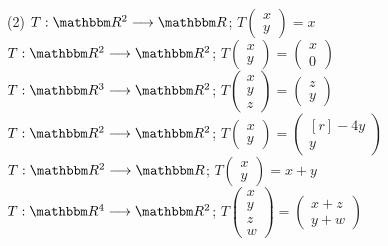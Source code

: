 \begin{tasks}[
    start=47,
    style=enumerate,
    label-offset = 3mm,
    ](2)
    \task $T: \RR[2] \longrightarrow \RR$; $T\begin{pmatrix}x \\ y\end{pmatrix}=x$
    \task $T: \RR[2] \longrightarrow \RR[2]$; $T\begin{pmatrix}x \\ y\end{pmatrix}=\begin{pmatrix}x \\ 0\end{pmatrix}$
    \task $T: \RR[3] \longrightarrow \RR[2]$; $T\begin{pmatrix}x \\ y \\ z\end{pmatrix}=\begin{pmatrix}z \\ y\end{pmatrix}$
    \task $T: \RR[2] \longrightarrow \RR[2]$; $T\begin{pmatrix}x \\ y\end{pmatrix}=\begin{pmatrix*}[r]-4 y \\ y\end{pmatrix*}$
    \task $T: \RR[2] \longrightarrow \RR$; $T\begin{pmatrix}x \\ y\end{pmatrix}=x+y$
    \task $T: \RR[4] \longrightarrow \RR[2]$; $T\begin{pmatrix}x \\ y \\ z \\ w\end{pmatrix}=\begin{pmatrix}x+z \\ y+w\end{pmatrix}$
\end{tasks}

